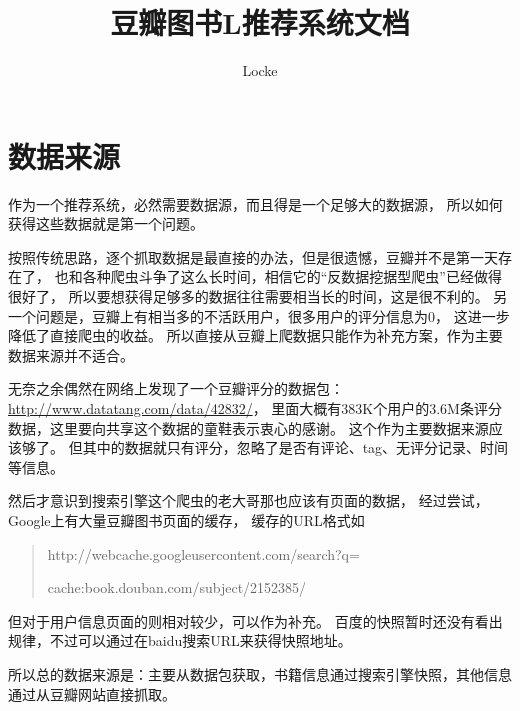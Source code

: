 \documentclass[a4paper,oneside]{ctexart}
\begin{document}
\title{\bfseries 豆瓣图书L推荐系统文档}
\author{Locke}
\maketitle

\section{数据来源}

作为一个推荐系统，必然需要数据源，而且得是一个足够大的数据源，
所以如何获得这些数据就是第一个问题。

按照传统思路，逐个抓取数据是最直接的办法，但是很遗憾，豆瓣并不是第一天存在了，
也和各种爬虫斗争了这么长时间，相信它的“反数据挖据型爬虫”已经做得很好了，
所以要想获得足够多的数据往往需要相当长的时间，这是很不利的。
另一个问题是，豆瓣上有相当多的不活跃用户，很多用户的评分信息为0，
这进一步降低了直接爬虫的收益。
所以直接从豆瓣上爬数据只能作为补充方案，作为主要数据来源并不适合。

无奈之余偶然在网络上发现了一个豆瓣评分的数据包：
\url{http://www.datatang.com/data/42832/}，
里面大概有383K个用户的3.6M条评分数据，这里要向共享这个数据的童鞋表示衷心的感谢。
这个作为主要数据来源应该够了。
但其中的数据就只有评分，忽略了是否有评论、tag、无评分记录、时间等信息。

然后才意识到搜索引擎这个爬虫的老大哥那也应该有页面的数据，
经过尝试，Google上有大量豆瓣图书页面的缓存，
缓存的URL格式如
\begin{quotation}
http://webcache.googleusercontent.com/search?q=

\quad cache:book.douban.com/subject/2152385/
\end{quotation}
但对于用户信息页面的则相对较少，可以作为补充。
百度的快照暂时还没有看出规律，不过可以通过在baidu搜索URL来获得快照地址。

所以总的数据来源是：主要从数据包获取，书籍信息通过搜索引擎快照，其他信息通过从豆瓣网站直接抓取。
\end{document}

